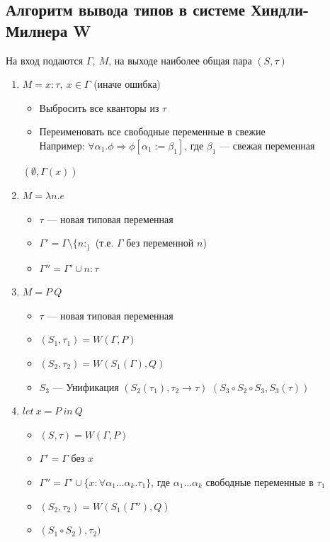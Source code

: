 \documentclass[12pt]{article}
\begin{document}
\subsection{Алгоритм вывода типов в системе Хиндли-Милнера W}
На вход подаются $\Gamma,\ M$, на выходе наиболее общая пара $(S, \tau)$
\begin{enumerate}
    \item $M = x : \tau,\ x \in \Gamma$ (иначе ошибка)
    \begin{itemize}
        \item Выбросить все кванторы из $\tau$
        \item Переименовать все свободные переменные в свежие \\
        Например: $\forall \alpha_1.\phi \Rightarrow \phi[\alpha_1 := \beta_1]$, где $\beta_1$ --- свежая переменная
    \end{itemize}
    $(\emptyset, \Gamma(x))$
    \item $M = \lambda n.e$
    \begin{itemize}
        \item $\tau$ --- новая типовая переменная
        \item $\Gamma' = \Gamma \setminus \{n : _\}$ (т.е. $\Gamma$ без переменной $n$)
        \item $\Gamma'' = \Gamma' \cup {n : \tau}$
    \end{itemize}
    \item $M = P\ Q$
    \begin{itemize}
        \item $\tau$ --- новая типовая переменная
        \item $(S_1, \tau_1) = W(\Gamma, P)$
        \item $(S_2, \tau_2) = W(S_1(\Gamma), Q)$
        \item $S_3$ --- Унификация $(S_2(\tau_1), \tau_2 \rightarrow \tau)$ $(S_3 \circ S_2 \circ S_3, S_3(\tau))$
    \end{itemize}
    \item $let\ x = P\ in\ Q$
    \begin{itemize}
        \item $(S, \tau) = W(\Gamma, P)$
        \item $\Gamma' = \Gamma$ без $x$
        \item $\Gamma'' = \Gamma' \cup \{ x : \forall \alpha_1 \dots \alpha_k. \tau_1 \}$, где $\alpha_1 \dots \alpha_k$ свободные переменные в $\tau_1$
        \item $(S_2, \tau_2) = W(S_1(\Gamma''), Q)$
        \item $(S_1 \circ S_2), \tau_2)$
    \end{itemize}
    
\end{enumerate}
\end{document}
